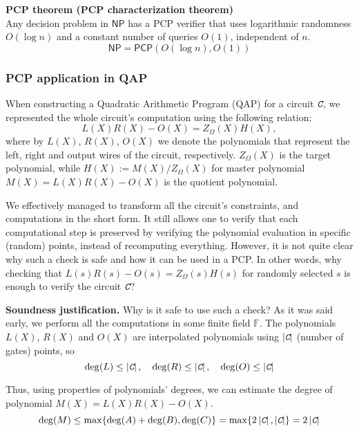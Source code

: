 \documentclass[../lecture-notes.tex]{subfiles}
\newcommand{\Circ}{\textit{\texttt{C}}}
\begin{document}
\begin{theorem}{\textbf{PCP theorem (PCP characterization theorem)}\\}
    Any decision problem in $\mathsf{NP}$ has a PCP verifier that uses logarithmic randomness 
    $O(\log n)$ and a constant number of queries $O(1)$, independent of $n$.
    \begin{equation*}
        \mathsf{NP} = \mathsf{PCP}(O(\log n), O(1))
    \end{equation*}
\end{theorem}

\subsubsection{PCP application in QAP}

When constructing a Quadratic Arithmetic Program (QAP) for a circuit $\Circ$, we represented the whole circuit's 
computation using the following relation:
\begin{equation*}
    L(X)R(X) - O(X) = Z_{\Omega}(X)H(X),
\end{equation*}
where by $L(X)$, $R(X)$, $O(X)$ we denote the polynomials that represent the left, right and output 
wires of the circuit, respectively. $Z_{\Omega}(X)$ is the target polynomial, while
$H(X) := M(X)\big/Z_{\Omega}(X)$ for master polynomial $M(X) = L(X)R(X) - O(X)$ is the quotient polynomial.

We effectively managed to transform all the circuit's constraints, and computations in the short form.
It still allows one to verify that each computational step is preserved by verifying the 
polynomial evaluation in specific (random) points, instead of recomputing everything. However, it is 
not quite clear why such a check is safe and how it can be used in a PCP. In other words, why checking that $L(s)R(s)-O(s)=Z_{\Omega}(s)H(s)$ for randomly selected $s$ is enough to verify the circuit $\Circ$?

\textbf{Soundness justification.} Why is it safe to use such a check? As it was said early, 
we perform all the computations in some finite field $\mathbb{F}$. The 
polynomials $L(X)$, $R(X)$ and $O(X)$ are interpolated polynomials using $\left| \Circ \right|$ (number of gates) points, so 
\begin{equation*}
    \deg(L) \le \left| \Circ \right|, \quad 
    \deg(R) \le \left| \Circ \right|, \quad 
    \deg(O) \le \left| \Circ \right|
\end{equation*}

Thus, using properties of polynomials' degrees, we can estimate the degree of polynomial $M(X) = L(X)R(X) - O(X)$.
\begin{equation*}
    \deg(M) \leq \max\{\deg(A) + \deg(B), \deg(C)\} = \max\{2 \left| \Circ \right|, \left| \Circ \right|\} = 2 \left| \Circ \right|
\end{equation*}
\end{document}
